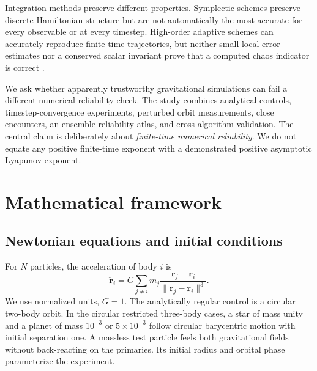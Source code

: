 \documentclass[10pt,letterpaper,twocolumn]{article}
\begin{document}
Integration methods preserve different properties. Symplectic schemes preserve discrete Hamiltonian structure but are not automatically the most accurate for every observable or at every timestep. High-order adaptive schemes can accurately reproduce finite-time trajectories, but neither small local error estimates nor a conserved scalar invariant prove that a computed chaos indicator is correct \cite{hairer2006geometric,rein2015ias15}.

We ask whether apparently trustworthy gravitational simulations can fail a different numerical reliability check. The study combines analytical controls, timestep-convergence experiments, perturbed orbit measurements, close encounters, an ensemble reliability atlas, and cross-algorithm validation. The central claim is deliberately about \emph{finite-time numerical reliability}. We do not equate any positive finite-time exponent with a demonstrated positive asymptotic Lyapunov exponent.

\section{Mathematical framework}
\subsection{Newtonian equations and initial conditions}
For $N$ particles, the acceleration of body $i$ is
\begin{equation}
 \ddot{\boldsymbol r}_i=G\sum_{j\ne i}m_j\frac{\boldsymbol r_j-\boldsymbol r_i}{\lVert\boldsymbol r_j-\boldsymbol r_i\rVert^3}.
\end{equation}
We use normalized units, $G=1$. The analytically regular control is a circular two-body orbit. In the circular restricted three-body cases, a star of mass unity and a planet of mass $10^{-3}$ or $5\times10^{-3}$ follow circular barycentric motion with initial separation one. A massless test particle feels both gravitational fields without back-reacting on the primaries. Its initial radius and orbital phase parameterize the experiment.
\end{document}
